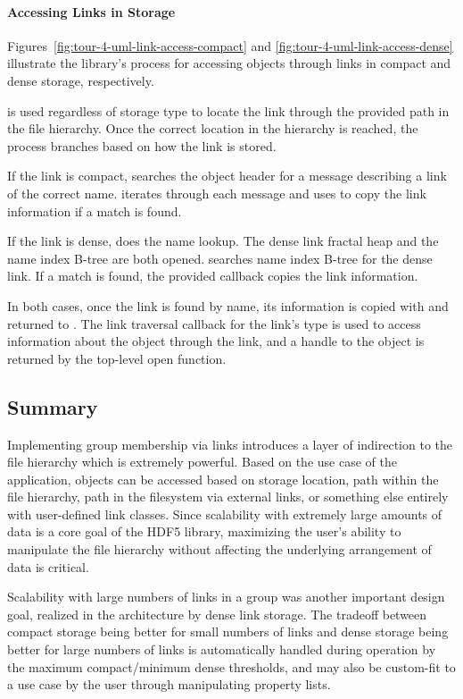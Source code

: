 \paragraph{Accessing Links in Storage} Figures~\ref{fig:tour-4-uml-link-access-compact} and \ref{fig:tour-4-uml-link-access-dense} illustrate the library's process for accessing objects through links in compact and dense storage, respectively.

 is used regardless of storage type to locate the link through the provided path in the file hierarchy. Once the correct location in the hierarchy is reached, the process branches based on how the link is stored.

If the link is compact,  searches the object header for a message describing a link of the correct name.  iterates through each message and uses  to copy the link information if a match is found.

If the link is dense,  does the name lookup. The dense link fractal heap and the name index B-tree are both opened.  searches name index B-tree for the dense link. If a match is found, the provided callback  copies the link information.

In both cases, once the link is found by name, its information is copied with  and returned to . The link traversal callback for the link's type is used to access information about the object through the link, and a handle to the object is returned by the top-level open function.

\subsection{Summary} Implementing group membership via links introduces a layer of indirection to the file hierarchy which is extremely powerful. Based on the use case of the application, objects can be accessed based on storage location, path within the file hierarchy, path in the filesystem via external links, or something else entirely with user-defined link classes. Since scalability with extremely large amounts of data is a core goal of the HDF5 library, maximizing the user's ability to manipulate the file hierarchy without affecting the underlying arrangement of data is critical.

Scalability with large numbers of links in a group was another important design goal, realized in the architecture by dense link storage. The tradeoff between compact storage being better for small numbers of links and dense storage being better for large numbers of links is automatically handled during operation by the maximum compact/minimum dense thresholds, and may also be custom-fit to a use case by the user through manipulating property lists.
